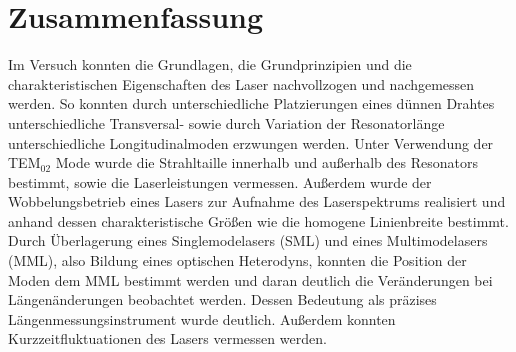 \documentclass[a4paper,twoside,final]{article}
\begin{document}
\newpage
\section{Zusammenfassung}
Im Versuch konnten die Grundlagen, die Grundprinzipien und die charakteristischen Eigenschaften des Laser nachvollzogen und nachgemessen werden. So konnten durch unterschiedliche Platzierungen eines dünnen Drahtes unterschiedliche Transversal- sowie durch Variation der Resonatorlänge unterschiedliche Longitudinalmoden erzwungen werden. Unter Verwendung der TEM$_{02}$ Mode wurde die Strahltaille innerhalb und außerhalb  des Resonators bestimmt, sowie die Laserleistungen vermessen. Außerdem wurde der Wobbelungsbetrieb eines Lasers zur Aufnahme des Laserspektrums realisiert und anhand dessen charakteristische Größen wie die homogene Linienbreite bestimmt. Durch Überlagerung eines Singlemodelasers (SML) und eines Multimodelasers (MML), also Bildung eines optischen Heterodyns, konnten die Position der Moden dem MML bestimmt werden und daran deutlich die Veränderungen bei Längenänderungen beobachtet werden. Dessen Bedeutung als präzises Längenmessungsinstrument wurde deutlich. Außerdem konnten Kurzzeitfluktuationen des Lasers vermessen werden.

{}


\newpage
\appendix
\end{document}
